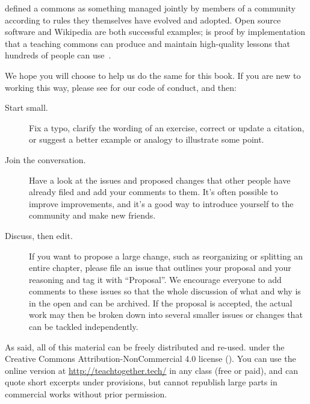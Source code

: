 
 defined a commons as
something managed jointly by members of a community
according to rules they themselves have evolved and adopted.
Open source software and Wikipedia are both successful examples;
 is proof by implementation that
a teaching commons can produce and maintain high-quality lessons
that hundreds of people can use~\cite{Wils2016,Deve2018}.

We hope you will choose to help us do the same for this book.
If you are new to working this way,
please see  for our code of conduct,
and then:

\begin{description}

\item[Start small.]
  Fix a typo,
  clarify the wording of an exercise,
  correct or update a citation,
  or suggest a better example or analogy to illustrate some point.

\item[Join the conversation.]
  Have a look at the issues and proposed changes that other people have already filed
  and add your comments to them.
  It's often possible to improve improvements,
  and it's a good way to introduce yourself to the community and make new friends.

\item[Discuss, then edit.]
  If you want to propose a large change,
  such as reorganizing or splitting an entire chapter,
  please file an issue that outlines your proposal and your reasoning and tag it with ``Proposal''.
  We encourage everyone to add comments to these issues
  so that the whole discussion of what and why is in the open and can be archived.
  If the proposal is accepted,
  the actual work may then be broken down into several smaller issues or changes
  that can be tackled independently.

\end{description}


As  said,
all of this material can be freely distributed and re-used.
under the Creative Commons Attribution-NonCommercial 4.0 license
().
You can use the online version at \url{http://teachtogether.tech/} in any class (free or paid),
and can quote short excerpts under  provisions,
but cannot republish large parts in commercial works without prior permission.

